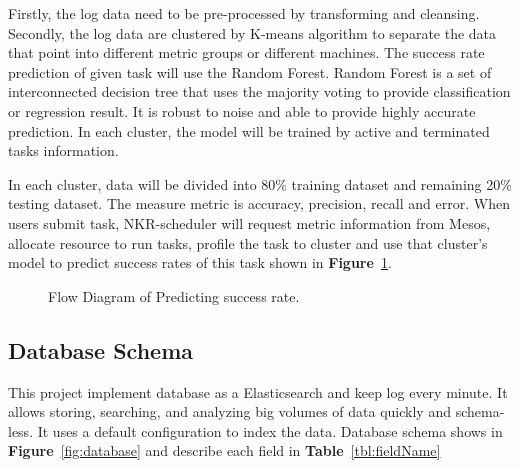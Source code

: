 \documentclass[12pt,oneside,openright,a4paper]{cpe-english-project}
\begin{document}
\begin{enumerate}
  Firstly, the log data need to be pre-processed by transforming and cleansing.  Secondly, the log data are clustered by K-means algorithm to separate the data that point into different metric groups or different machines.  The success rate prediction of given task will use the Random Forest. Random Forest is a set of interconnected decision tree that uses the majority voting to provide classification or regression result. It is robust to noise and able to provide highly accurate prediction. \cite{adaptiveScheduling} In each cluster, the model will be trained by active and terminated tasks information. 

  In each cluster, data will be divided into 80\% training dataset and remaining 20\% testing dataset. The measure metric is accuracy, precision, recall and error. When users submit task, NKR-scheduler will request metric information from Mesos, allocate resource to run tasks, profile the task to cluster and use that cluster’s model to predict success rates of this task shown in \textbf{Figure}~\ref{fig:flowDiagramPredict}.

  \begin{figure}[!h]\centering
    \setlength{\fboxrule}{0mm} %
    \setlength{\fboxsep}{0cm}
    \caption{Flow Diagram of Predicting success rate.}\label{fig:flowDiagramPredict}
  \end{figure}

\end{enumerate}

\subsection{Database Schema}  

This project implement database as a Elasticsearch and keep log every minute. It allows storing, searching, and analyzing big volumes of data quickly and schema-less. It uses a default configuration to index the data. Database schema shows in \textbf{Figure}~\ref{fig:database} and describe each field in \textbf{Table}~\ref{tbl:fieldName}
\end{document}
